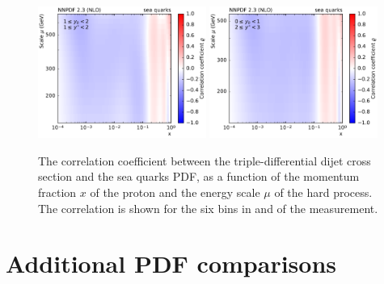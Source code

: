 \begin{figure}[htbp]
    \includegraphics[width=0.49\textwidth]{figures/pdf_constraints/corr_PTMAXEXPYS_YBYS_NLO_FINALBINS_NNPDF23_sea_quarks_ys1_0yb1_0_cl.pdf}\hfill
    \includegraphics[width=0.49\textwidth]{figures/pdf_constraints/corr_PTMAXEXPYS_YBYS_NLO_FINALBINS_NNPDF23_sea_quarks_ys2_0yb0_0_cl.pdf}\hfill
    \caption[Correlation between dijet cross section and sea quarks PDF]{
            The correlation coefficient between the triple-differential dijet cross
            section and the sea quarks PDF, as a function of the momentum fraction $x$ of the
            proton and the energy scale $\mu$ of the hard process. The correlation is shown
            for the six bins in \ystar and \yboost of the measurement.}
    \label{fig:pdfconstraints_sea_quarks}
\end{figure}

\section{Additional PDF comparisons}

